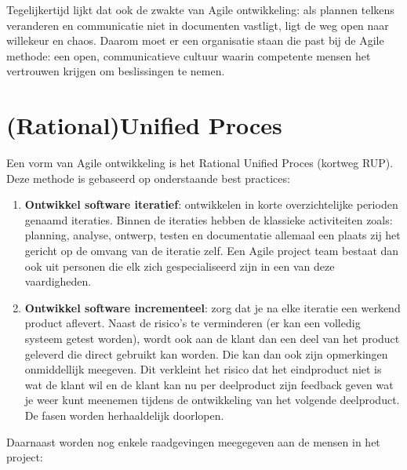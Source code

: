 Tegelijkertijd lijkt dat ook de zwakte van Agile ontwikkeling: als plannen telkens veranderen en communicatie niet in documenten vastligt, ligt de weg open naar willekeur en chaos. Daarom moet er een organisatie staan die past bij de Agile methode: een open, communicatieve cultuur waarin competente mensen het vertrouwen krijgen om beslissingen te nemen.

\section{(Rational)Unified Proces}
Een vorm van Agile ontwikkeling is het Rational Unified Proces \cite{VantEinde2014} (kortweg RUP). Deze methode is gebaseerd op onderstaande best practices:

\begin{enumerate}
	\item \textbf{Ontwikkel software iteratief}: ontwikkelen in korte overzichtelijke perioden genaamd iteraties. Binnen de iteraties hebben de klassieke activiteiten zoals: planning, analyse, ontwerp, testen en documentatie allemaal een plaats zij het gericht op de omvang van de iteratie zelf. Een Agile project team bestaat dan ook uit personen die elk zich gespecialiseerd zijn in een van deze vaardigheden.
	\item \textbf{Ontwikkel software incrementeel}: zorg dat je na elke iteratie een werkend product aflevert. Naast de risico's te verminderen (er kan een volledig systeem getest worden), wordt ook aan de klant dan een deel van het product geleverd die direct gebruikt kan worden. Die kan dan ook zijn opmerkingen onmiddellijk meegeven. Dit verkleint het risico dat het eindproduct niet is wat de klant wil en de klant kan nu per deelproduct zijn feedback geven wat je weer kunt meenemen tijdens de ontwikkeling van het volgende deelproduct. De fasen worden herhaaldelijk doorlopen. 
	
	\end{enumerate}
Daarnaast worden nog enkele raadgevingen meegegeven aan de mensen in het project:

